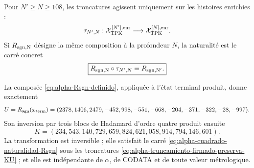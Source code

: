 \begin{definition}
Pour \(N'\geq N\geq108\), les troncatures agissent uniquement sur les histoires
enrichies :
\begin{equation}\label{eq:alpha-truncamiento-firmado-preserva-KU}
 \tau_{N',N}:
 \mathcal X_{\rm TPK}^{[N'],\rm enr}
 \longrightarrow\mathcal X_{\rm TPK}^{[N],\rm enr}.
\end{equation}
Si \(R_{\rm sgn,N}\) désigne la même composition à la profondeur \(N\), la
naturalité est le carré concret
\begin{equation}\label{eq:alpha-cuadrado-naturalidad-Rsgn}
 \boxed{
 R_{\rm sgn,N}\circ\tau_{N',N}
 =R_{\rm sgn,N'}.}
\end{equation}
\end{definition}

\begin{theorem}
\label{thm:alpha-Rsgn-construido}
La composée \eqref{eq:alpha-Rsgn-definido}, appliquée à l'état terminal
produit, donne exactement
\begin{equation}\label{eq:alpha-Rsgn-evaluacion}
 U=R_{\rm sgn}(x_{\rm term})
 =(2378,1406,2479,-452,998,-551,-668,-204,-371,-322,-28,-997).
\end{equation}
Son inversion par trois blocs de Hadamard d'ordre quatre produit ensuite
\[
 \boxed{
 K=(234,543,140,729,659,824,621,058,914,794,146,601).}
\]
La transformation est inversible ; elle satisfait le carré
\eqref{eq:alpha-cuadrado-naturalidad-Rsgn} sous les troncatures
\eqref{eq:alpha-truncamiento-firmado-preserva-KU} ; et elle est indépendante de
\(\alpha\), de CODATA et de toute valeur métrologique.
\end{theorem}

